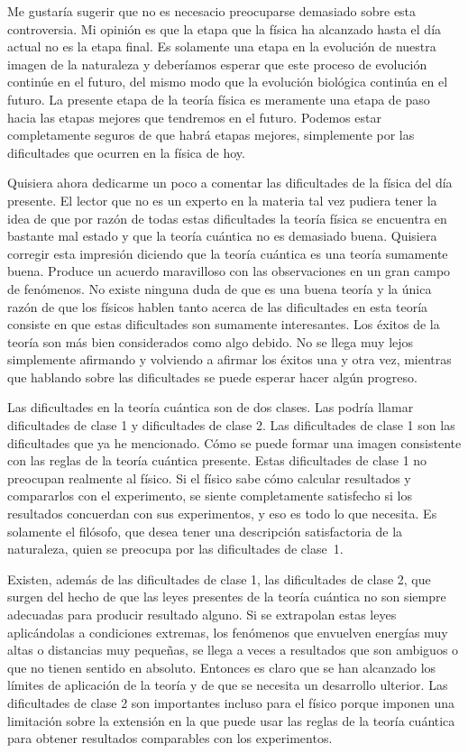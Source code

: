\documentclass[a4paper, 12pt]{article}
\begin{document}
Me gustaría sugerir que no es necesacio preocuparse demasiado sobre esta controversia. Mi opinión  es que la etapa que la física ha alcanzado hasta el día actual no es la etapa final. Es solamente una etapa en la evolución de nuestra imagen de la naturaleza y deberíamos esperar que este  proceso de evolución continúe en el futuro, del mismo modo que la evolución biológica continúa en el futuro. La presente etapa de la teoría física es meramente una etapa de paso hacia las etapas mejores que tendremos en el futuro. Podemos estar completamente seguros de que habrá etapas mejores, simplemente por las dificultades que ocurren en la física de hoy.

Quisiera ahora dedicarme un poco a comentar las dificultades de la física del día presente. El lector que no es un experto en la materia tal vez pudiera tener la idea de que por razón de todas estas dificultades la teoría física se encuentra en bastante mal estado y que la teoría cuántica no es demasiado buena. Quisiera corregir esta impresión diciendo que la teoría cuántica es una teoría sumamente buena. Produce un acuerdo maravilloso con las observaciones en un gran campo de fenómenos. No existe ninguna duda de que es una buena teoría y la única razón de que los físicos hablen tanto acerca de las dificultades en esta teoría consiste en que estas dificultades son  sumamente interesantes. Los éxitos de la teoría son más bien considerados como algo debido. No se llega muy lejos simplemente afirmando y volviendo a afirmar los éxitos una y otra vez, mientras que hablando sobre las dificultades se puede esperar hacer algún progreso.

Las dificultades en la teoría cuántica son de dos clases. Las podría llamar dificultades de clase 1 y dificultades de clase 2. Las dificultades de clase 1 son las dificultades que ya he mencionado. Cómo se puede formar una imagen consistente con las reglas de la teoría cuántica presente. Estas dificultades de clase 1 no preocupan realmente al físico. Si el físico sabe cómo calcular resultados y compararlos con el experimento, se siente completamente satisfecho si los resultados concuerdan con sus experimentos, y eso es todo lo que necesita. Es solamente el filósofo, que desea tener una descripción satisfactoria de la naturaleza, quien se preocupa por las dificultades de clase~1.

Existen, además de las dificultades de clase 1, las dificultades de clase 2, que surgen del hecho de que las leyes presentes de la teoría cuántica no son siempre adecuadas para producir resultado alguno. Si se extrapolan estas leyes aplicándolas a condiciones extremas, los fenómenos que envuelven energías muy altas o distancias muy pequeñas, se llega a veces a resultados que son ambiguos o que no tienen sentido en absoluto. Entonces es claro que se han alcanzado los límites de aplicación de la teoría y de que se necesita un desarrollo ulterior. Las dificultades de clase 2 son importantes incluso para el físico porque imponen una limitación sobre la extensión en la que puede usar las reglas de la teoría cuántica para obtener resultados comparables con los experimentos.
\end{document}
